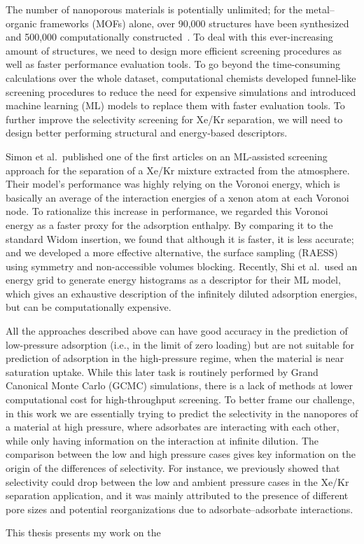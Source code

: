 The number of nanoporous materials is potentially unlimited; for the metal--organic frameworks (MOFs) alone, over 90,000 structures have been synthesized~\cite{Groom_2016} and 500,000 computationally constructed~\cite{Wilmer_2012,Boyd_2016,Colon_2017}. To deal with this ever-increasing amount of structures, we need to design more efficient screening procedures as well as faster performance evaluation tools. To go beyond the time-consuming calculations over the whole dataset, computational chemists developed funnel-like screening procedures to reduce the need for expensive simulations and introduced machine learning (ML) models to replace them with faster evaluation tools.\cite{Ren_2022} To further improve the selectivity screening for Xe/Kr separation, we will need to design better performing structural and energy-based descriptors.

Simon et al.\ published one of the first articles on an ML-assisted screening approach for the separation of a Xe/Kr mixture extracted from the atmosphere.\cite{Simon_2015} Their model's performance was highly relying on the Voronoi energy, which is basically an average of the interaction energies of a xenon atom at each Voronoi node.\cite{Rycroft_2009} To rationalize this increase in performance, we regarded this Voronoi energy as a faster proxy for the adsorption enthalpy. By comparing it to the standard Widom insertion, we found that although it is faster, it is less accurate; and we developed a more effective alternative, the surface sampling (RAESS) using symmetry and non-accessible volumes blocking.\cite{Ren_2023} Recently, Shi et al.\ used an energy grid to generate energy histograms as a descriptor for their ML model, which gives an exhaustive description of the infinitely diluted adsorption energies,\cite{Shi_2023} but can be computationally expensive.

All the approaches described above can have good accuracy in the prediction of low-pressure adsorption (i.e., in the limit of zero loading) but are not suitable for prediction of adsorption in the high-pressure regime, when the material is near saturation uptake. While this later task is routinely performed by Grand Canonical Monte Carlo (GCMC) simulations, there is a lack of methods at lower computational cost for high-throughput screening. To better frame our challenge, in this work we are essentially trying to predict the selectivity in the nanopores of a material at high pressure, where adsorbates are interacting with each other, while only having information on the interaction at infinite dilution. The comparison between the low and high pressure cases gives key information on the origin of the differences of selectivity. For instance, we previously showed that selectivity could drop between the low and ambient pressure cases in the Xe/Kr separation application, and it was mainly attributed to the presence of different pore sizes and potential reorganizations due to adsorbate--adsorbate interactions.\cite{Ren_2021}


\begin{center}
\end{center}

This thesis presents my work on the 

\vfill
\begin{center}
\end{center}
\vfill\vfill